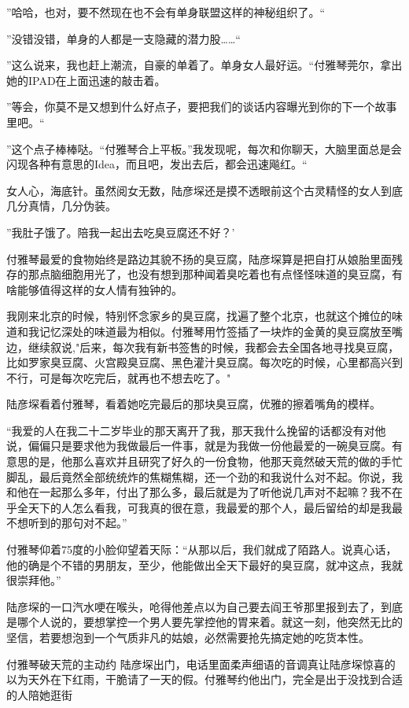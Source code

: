 \documentclass[11pt,a4paper]{article}
\begin{document}
”哈哈，也对，要不然现在也不会有单身联盟这样的神秘组织了。“﻿﻿

”没错没错，单身的人都是一支隐藏的潜力股……“﻿﻿

”这么说来，我也赶上潮流，自豪的单着了。单身女人最好运。“付雅琴莞尔，拿出她的IPAD在上面迅速的敲击着。﻿﻿

”等会，你莫不是又想到什么好点子，要把我们的谈话内容曝光到你的下一个故事里吧。“﻿﻿

”这个点子棒棒哒。“付雅琴合上平板。”我发现呢，每次和你聊天，大脑里面总是会闪现各种有意思的Idea，而且吧，发出去后，都会迅速飚红。“﻿﻿

女人心，海底针。虽然阅女无数，陆彦堔还是摸不透眼前这个古灵精怪的女人到底几分真情，几分伪装。﻿﻿

”我肚子饿了。陪我一起出去吃臭豆腐还不好？’﻿﻿

付雅琴最爱的食物始终是路边其貌不扬的臭豆腐，陆彦堔算是把自打从娘胎里面残存的那点脑细胞用光了，也没有想到那种闻着臭吃着也有点怪怪味道的臭豆腐，有啥能够值得这样的女人情有独钟的。﻿﻿

我刚来北京的时候，特别怀念家乡的臭豆腐，找遍了整个北京，也就这个摊位的味道和我记忆深处的味道最为相似。付雅琴用竹签插了一块炸的金黄的臭豆腐放至嘴边，继续叙说,"后来，每次我有新书签售的时候，我都会去全国各地寻找臭豆腐，比如罗家臭豆腐、火宫殿臭豆腐、黑色灌汁臭豆腐。每次吃的时候，心里都高兴到不行，可是每次吃完后，就再也不想去吃了。"﻿﻿

陆彦堔看着付雅琴，看着她吃完最后的那块臭豆腐，优雅的擦着嘴角的模样。﻿﻿

“我爱的人在我二十二岁毕业的那天离开了我，那天我什么挽留的话都没有对他说，偏偏只是要求他为我做最后一件事，就是为我做一份他最爱的一碗臭豆腐。有意思的是，他那么喜欢并且研究了好久的一份食物，他那天竟然破天荒的做的手忙脚乱，最后竟然全部统统炸的焦糊焦糊，还一个劲的和我说什么对不起。你说，我和他在一起那么多年，付出了那么多，最后就是为了听他说几声对不起嘛？我不在乎全天下的人怎么看我，可我真的很在意，我最爱的那个人，最后留给的却是我最不想听到的那句对不起。”﻿﻿

付雅琴仰着75度的小脸仰望着天际：“从那以后，我们就成了陌路人。说真心话，他的确是个不错的男朋友，至少，他能做出全天下最好的臭豆腐，就冲这点，我就很崇拜他。”﻿﻿﻿

陆彦堔的一口汽水哽在喉头，呛得他差点以为自己要去阎王爷那里报到去了，到底是哪个人说的，要想掌控一个男人要先掌控他的胃来着。就这一刻，他突然无比的坚信，若要想泡到一个气质非凡的姑娘，必然需要抢先搞定她的吃货本性。﻿﻿

付雅琴破天荒的主动约 陆彦堔出门，电话里面柔声细语的音调真让陆彦堔惊喜的以为天外在下红雨，干脆请了一天的假。付雅琴约他出门，完全是出于没找到合适的人陪她逛街﻿﻿
\end{document}
